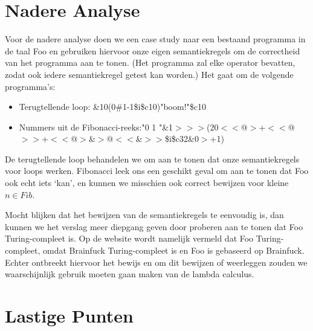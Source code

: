 \documentclass[11pt]{article}
\begin{document}
\section{Nadere Analyse}

Voor de nadere analyse doen we een case study naar een bestaand programma in de taal Foo en gebruiken hiervoor onze eigen semantiekregels om de correctheid van het programma aan te tonen. 
(Het programma zal elke operator bevatten, zodat ook iedere semantiekregel getest kan worden.)
 Het gaat om de volgende programma's:

\begin{itemize}
\item Terugtellende loop: \&10(0\#1-1\$i\$c10)"boom!"\$c10
\item Nummers uit de Fibonacci-reeks:\newline "0 1 "\&1\(>>>\)(20\(<<\)@\(>\)+\(<<\)@\(>>+<<\)@\(>\)\&\(>\)@\(<<\)\&\(>>\)\$i\$c32\&0\(>\)+1)
\end{itemize}


De terugtellende loop behandelen we om aan te tonen dat onze semantiekregels voor loops werken.
Fibonacci leek ons een geschikt geval om aan te tonen dat Foo ook echt iets `kan', en kunnen we misschien ook correct bewijzen voor kleine \(n \in Fib\).

Mocht blijken dat het bewijzen van de semantiekregels te eenvoudig is, dan kunnen we het verslag meer diepgang geven door proberen aan te tonen dat Foo Turing-compleet is.
Op de website wordt namelijk vermeld dat Foo Turing-compleet, omdat Brainfuck Turing-compleet is en Foo is gebaseerd op Brainfuck. 
Echter ontbreekt hiervoor het bewijs en om dit bewijzen of weerleggen zouden we waarschijnlijk gebruik moeten gaan maken van de lambda calculus.


\section{Lastige Punten}
\end{document}
